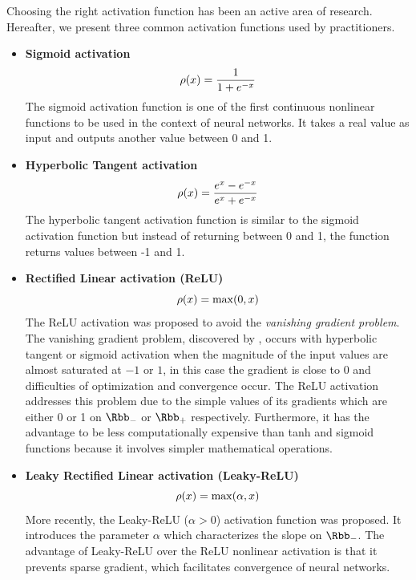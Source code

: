 Choosing the right activation function has been an active area of research.
Hereafter, we present three common activation functions used by practitioners.
\begin{itemize}
  \item \textbf{Sigmoid activation}
    \begin{equation*}
      \rho(x) = \frac{1}{1+e^{-x}} 
    \end{equation*}
    The sigmoid activation function is one of the first continuous nonlinear functions to be used in the context of neural networks.
		It takes a real value as input and outputs another value between 0 and 1.
  \item \textbf{Hyperbolic Tangent activation}
    \begin{equation*}
      \rho(x) = \frac{e^x - e^{-x}}{e^x + e^{-x}}
    \end{equation*}
    The hyperbolic tangent activation function is similar to the sigmoid activation function but instead of returning between 0 and 1, the function returns values between -1 and 1.
  \item \textbf{Rectified Linear activation (ReLU)} \cite{nair2010rectified}
    \begin{equation*}
      \rho(x) = \max(0, x)
    \end{equation*}
    The ReLU activation was proposed to avoid the \emph{vanishing gradient problem}.
    The vanishing gradient problem, discovered by \citet{bengio1994learning}, occurs with hyperbolic tangent or sigmoid activation when the magnitude of the input values are almost saturated at $-1$ or $1$, in this case the gradient is close to $0$ and difficulties of optimization and convergence occur.
    The ReLU activation addresses this problem due to the simple values of its gradients which are either 0 or 1 on $\Rbb_-$ or $\Rbb_+$ respectively.
    Furthermore, it has the advantage to be less computationally expensive than tanh and sigmoid functions because it involves simpler mathematical operations.
  \item \textbf{Leaky Rectified Linear activation (Leaky-ReLU)} \cite{maas2013rectifier}
    \begin{equation*}
      \rho(x) = \max(\alpha, x)
    \end{equation*}
    More recently, the Leaky-ReLU ($\alpha > 0$) activation function was proposed.
    It introduces the parameter $\alpha$ which characterizes the slope on $\Rbb_-$.
    The advantage of Leaky-ReLU over the ReLU nonlinear activation is that it prevents sparse gradient, which facilitates convergence of neural networks.
\end{itemize}



